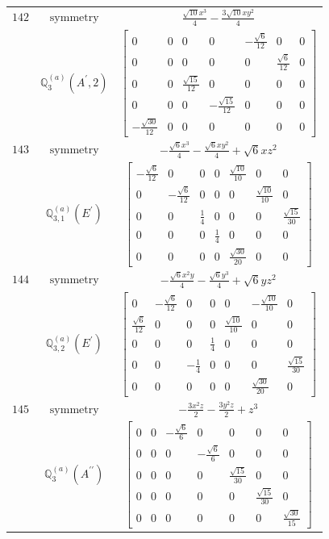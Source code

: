 \documentclass[fleqn,8pt,landscape]{jsarticle}
\begin{document}
\begin{longtable}{ccc}
$ 142 $ & $ \text{symmetry} $ & $ \frac{\sqrt{10} x^{3}}{4} - \frac{3 \sqrt{10} x y^{2}}{4} $ \\
$  $ & $ \mathbb{Q}_{3}^{(a)}(A^{\prime},2) $ & $ \begin{bmatrix} 0 & 0 & 0 & 0 & - \frac{\sqrt{6}}{12} & 0 & 0 \\ 0 & 0 & 0 & 0 & 0 & \frac{\sqrt{6}}{12} & 0 \\ 0 & 0 & \frac{\sqrt{15}}{12} & 0 & 0 & 0 & 0 \\ 0 & 0 & 0 & - \frac{\sqrt{15}}{12} & 0 & 0 & 0 \\ - \frac{\sqrt{30}}{12} & 0 & 0 & 0 & 0 & 0 & 0 \end{bmatrix} $ \\ \hline
$ 143 $ & $ \text{symmetry} $ & $ - \frac{\sqrt{6} x^{3}}{4} - \frac{\sqrt{6} x y^{2}}{4} + \sqrt{6} x z^{2} $ \\
$  $ & $ \mathbb{Q}_{3,1}^{(a)}(E^{\prime}) $ & $ \begin{bmatrix} - \frac{\sqrt{6}}{12} & 0 & 0 & 0 & \frac{\sqrt{10}}{10} & 0 & 0 \\ 0 & - \frac{\sqrt{6}}{12} & 0 & 0 & 0 & \frac{\sqrt{10}}{10} & 0 \\ 0 & 0 & \frac{1}{4} & 0 & 0 & 0 & \frac{\sqrt{15}}{30} \\ 0 & 0 & 0 & \frac{1}{4} & 0 & 0 & 0 \\ 0 & 0 & 0 & 0 & \frac{\sqrt{30}}{20} & 0 & 0 \end{bmatrix} $ \\ \hline
$ 144 $ & $ \text{symmetry} $ & $ - \frac{\sqrt{6} x^{2} y}{4} - \frac{\sqrt{6} y^{3}}{4} + \sqrt{6} y z^{2} $ \\
$  $ & $ \mathbb{Q}_{3,2}^{(a)}(E^{\prime}) $ & $ \begin{bmatrix} 0 & - \frac{\sqrt{6}}{12} & 0 & 0 & 0 & - \frac{\sqrt{10}}{10} & 0 \\ \frac{\sqrt{6}}{12} & 0 & 0 & 0 & \frac{\sqrt{10}}{10} & 0 & 0 \\ 0 & 0 & 0 & \frac{1}{4} & 0 & 0 & 0 \\ 0 & 0 & - \frac{1}{4} & 0 & 0 & 0 & \frac{\sqrt{15}}{30} \\ 0 & 0 & 0 & 0 & 0 & \frac{\sqrt{30}}{20} & 0 \end{bmatrix} $ \\ \hline
$ 145 $ & $ \text{symmetry} $ & $ - \frac{3 x^{2} z}{2} - \frac{3 y^{2} z}{2} + z^{3} $ \\
$  $ & $ \mathbb{Q}_{3}^{(a)}(A^{\prime\prime}) $ & $ \begin{bmatrix} 0 & 0 & - \frac{\sqrt{6}}{6} & 0 & 0 & 0 & 0 \\ 0 & 0 & 0 & - \frac{\sqrt{6}}{6} & 0 & 0 & 0 \\ 0 & 0 & 0 & 0 & \frac{\sqrt{15}}{30} & 0 & 0 \\ 0 & 0 & 0 & 0 & 0 & \frac{\sqrt{15}}{30} & 0 \\ 0 & 0 & 0 & 0 & 0 & 0 & \frac{\sqrt{30}}{15} \end{bmatrix} $ \\ \hline

\end{longtable}
\end{document}
